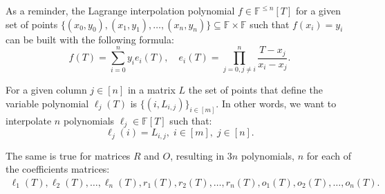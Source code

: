 \documentclass[../../book.tex]{subfiles}
\begin{document}
\begin{remark}
    As a reminder, the Lagrange interpolation polynomial $f \in
    \mathbb{F}^{\leq n}[T]$ for a given set of points
    $\{(x_0,y_0),(x_1,y_1),\dots,(x_n,y_n)\} \subseteq \mathbb{F} \times
    \mathbb{F}$ such that $f(x_i)=y_i$ can be built with the following formula:
    \begin{equation*}
        f(T) = \sum_{i=0}^{n} y_i e_i(T), \quad e_i(T) = \prod_{j=0, j \neq i}^{n} \frac{T-x_j}{x_i-x_j}.
    \end{equation*}  
\end{remark}

For a given column $j \in [n]$ in a matrix $L$ the set of points that define the
variable polynomial $\ell_j(T)$ is $\{(i, L_{i,j})\}_{i \in
[m]}$. In other words, we want to interpolate $n$ polynomials $\ell_j \in
\mathbb{F}[T]$ such that:
\begin{equation*}
    \ell_j(i) = L_{i,j}, \; i \in [m], \; j \in [n].
\end{equation*}

The same is true for matrices $R$ and $O$, resulting in $3n$ polynomials, $n$ for each of the
coefficients matrices:
\begin{align*}
    \ell_1(T), \ell_2(T), \dots, \ell_n(T), 
    r_1(T), r_2(T), \dots, r_n(T),
    o_1(T), o_2(T), \dots, o_n(T).
\end{align*}
\end{document}
